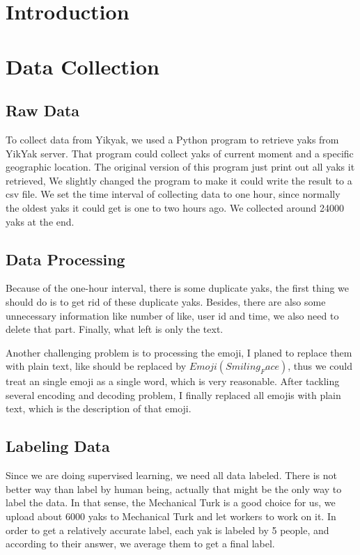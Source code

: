 \documentclass{article}
\begin{document}
  \author{Siqi Wu\\ Tianxiao Zhang \\ Siqi Bian (Susie)\\ Minhao Cheng}
  \section{Introduction}
  \section{Data Collection}
\subsection{Raw Data}
      To collect data from Yikyak, we used a Python program to retrieve yaks from YikYak server. That program could collect yaks of current moment and a specific geographic location. The original version of this program just print out all yaks it retrieved, We slightly changed the program to make it could write the result to a csv file. We set the time interval of collecting data to one hour, since normally the oldest yaks it could get is one to two hours ago. We collected around 24000 yaks at the end.
    \subsection{Data Processing}
      Because of the one-hour interval, there is some duplicate yaks, the first thing we should do is to get rid of these duplicate yaks. Besides, there are also some unnecessary information like number of like, user id and time, we also need to delete that part. Finally, what left is only the text.

      Another challenging problem is to processing the emoji, I planed to replace them with plain text, like should be replaced by $Emoji(Smiling_Face)$, thus we could treat an single emoji as a single word, which is very reasonable. After tackling several encoding and decoding problem, I finally replaced all emojis with plain text, which is the description of that emoji.

    \subsection{Labeling Data}
      Since we are doing supervised learning, we need all data labeled. There is not better way than label by human being, actually that might be the only way to label the data. In that sense, the Mechanical Turk is a good choice for us, we upload about 6000 yaks to Mechanical Turk and let workers to work on it. In order to get a relatively accurate label, each yak is labeled by 5 people, and according to their answer, we average them to get a final label.
\end{document}
